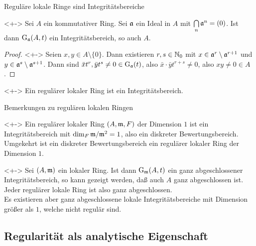 \begin{frame}{Reguläre lokale Ringe sind Integritätsbereiche}
	\begin{lemma}<+->
		Sei \(A\) ein kommutativer Ring. Sei \(\mathfrak{a}\) ein Ideal in \(A\) mit \(\bigcap\limits_n \mathfrak{a}^n = (0)\).
		Ist dann \(\operatorname{G}_{\mathfrak{a}}(A, t)\) ein Integritätsbereich, so auch \(A\).
	\end{lemma}
	\begin{proof}<+->
		Seien \(x, y \in A \setminus \{0\}\). Dann existieren \(r, s \in \mathbb N_0\) mit \(x \in \mathfrak{a}^r \setminus \mathfrak{a}^{r + 1}\)
		und \(y \in \mathfrak{a}^s \setminus \mathfrak{a}^{s + 1}\). Dann sind \(\bar x t^r, \bar y t^s \neq 0 \in \operatorname{G}_{\mathfrak{a}}(t)\),
		also \(\bar x \cdot \bar y t^{r + s} \neq 0\), also \(x y \neq 0 \in A\).
	\end{proof}
	\begin{corollary}<+->
		Ein regulärer lokaler Ring ist ein Integritätsbereich.
	\end{corollary}
\end{frame}

\begin{frame}{Bemerkungen zu regulären lokalen Ringen}
	\begin{remark}<+->
		Ein regulärer lokaler Ring \((A, \mathfrak{m}, F)\) der Dimension \(1\) ist ein Integritätsbereich mit \(\dim_F \mathfrak{m}/\mathfrak{m}^2
		= 1\), also ein diskreter Bewertungsbereich.
		\\
		Umgekehrt ist ein diskreter Bewertungsbereich ein regulärer lokaler Ring der Dimension \(1\).
	\end{remark}
	\begin{remark}<+->
		Sei \((A, \mathfrak{m})\) ein lokaler Ring. Ist dann \(\operatorname{G}_{\mathfrak{m}}(A, t)\) ein ganz abgeschlossener Integritätsbereich,
		so kann gezeigt werden, daß auch \(A\) ganz abgeschlossen ist. Jeder regulärer lokale Ring ist also ganz abgeschlossen.
		\\
		Es existieren aber ganz abgeschlossene lokale Integritätsbereiche mit Dimension größer als \(1\), welche nicht regulär sind.
	\end{remark}
\end{frame}

\subsection{Regularität als analytische Eigenschaft}

